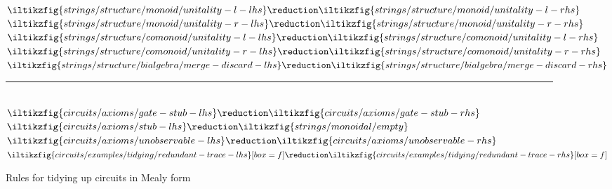 \begin{figure}
    \centering
    \(
    \iltikzfig{strings/structure/monoid/unitality-l-lhs}
    \reduction
    \iltikzfig{strings/structure/monoid/unitality-l-rhs}
    \)
    \quad
    \(
    \iltikzfig{strings/structure/monoid/unitality-r-lhs}
    \reduction
    \iltikzfig{strings/structure/monoid/unitality-r-rhs}
    \)
    \quad
    \(
    \iltikzfig{strings/structure/comonoid/unitality-l-lhs}
    \reduction
    \iltikzfig{strings/structure/comonoid/unitality-l-rhs}
    \)
    \quad
    \(
    \iltikzfig{strings/structure/comonoid/unitality-r-lhs}
    \reduction
    \iltikzfig{strings/structure/comonoid/unitality-r-rhs}
    \)
    \quad
    \(
    \iltikzfig{strings/structure/bialgebra/merge-discard-lhs}
    \reduction
    \iltikzfig{strings/structure/bialgebra/merge-discard-rhs}
    \)
    \\[0.25em]
    \rule{\textwidth}{0.1mm}
    \\[0.5em]
    \(
    \iltikzfig{circuits/axioms/gate-stub-lhs}
    \reduction
    \iltikzfig{circuits/axioms/gate-stub-rhs}
    \)
    \quad
    \(
    \iltikzfig{circuits/axioms/stub-lhs}
    \reduction
    \iltikzfig{strings/monoidal/empty}
    \)
    \quad
    \(
    \iltikzfig{circuits/axioms/unobservable-lhs}
    \reduction
    \iltikzfig{circuits/axioms/unobservable-rhs}
    \)
    \quad
    \(
    \iltikzfig{circuits/examples/tidying/redundant-trace-lhs}[box=f]
    \reduction
    \iltikzfig{circuits/examples/tidying/redundant-trace-rhs}[box=f]
    \)
    \caption{Rules for tidying up circuits in Mealy form}
    \label{fig:tidy-rules}
\end{figure}